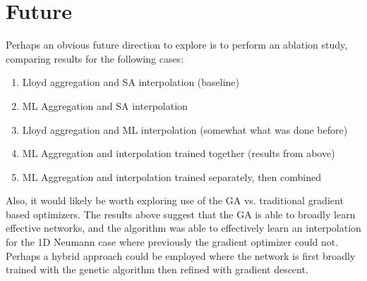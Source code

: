 \documentclass{article}
\begin{document}
\section{Future}
Perhaps an obvious future direction to explore is to perform an ablation study, comparing results for the following cases:
\begin{enumerate}
\item Lloyd aggregation and SA interpolation (baseline)
\item ML Aggregation and SA interpolation
\item Lloyd aggregation and ML interpolation (somewhat what was done before)
\item ML Aggregation and interpolation trained together (results from above)
\item ML Aggregation and interpolation trained separately, then combined
\end{enumerate}

Also, it would likely be worth exploring use of the GA vs. traditional gradient based optimizers.  The results above suggest that the GA is able to broadly learn effective networks, and the algorithm was able to effectively learn an interpolation for the 1D Neumann case where previously the gradient optimizer could not.  Perhaps a hybrid approach could be employed where the network is first broadly trained with the genetic algorithm then refined with gradient descent.



\end{document}
